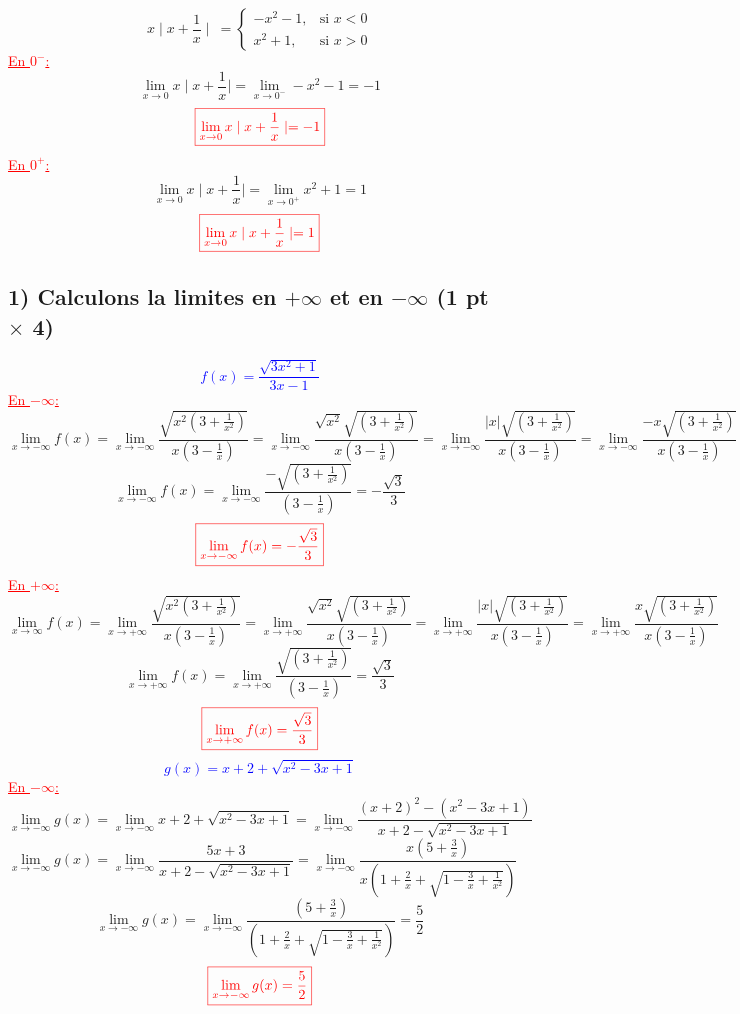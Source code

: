 \documentclass[12pt]{article}
\begin{document}
\[ x\mid x+\frac{1}{x}\mid\ = \begin{cases} 
  -x^{2}-1, & \text{si } x < 0 \\
  x^{2}+1, & \text{si } x > 0
\end{cases} \]
\textcolor{red}{\underline{En $0^{-}$:}}
\[\lim_{x \to 0}x\mid x+\frac{1}{x}\mid=\lim_{x \to 0^{-}}-x^{2}-1=-1\]
\[\textcolor{red}{\boxed{\lim_{x \to 0}x\mid x+\frac{1}{x}\mid=-1}}\]
\textcolor{red}{\underline{En $0^{+}$:}}
\[\lim_{x \to 0}x\mid x+\frac{1}{x}\mid=\lim_{x \to 0^{+}}x^{2}+1=1\]
\[\textcolor{red}{\boxed{\lim_{x \to 0}x\mid x+\frac{1}{x}\mid=1}}\]
\subsection*{1) Calculons la limites en $+\infty$ et en $-\infty$ (1 pt $\times$ 4)}
\textcolor{blue}{\[ f(x)=\frac{\sqrt{3x^{2}+1}}{3x-1}\]} 
\textcolor{red}{\underline{En $-\infty$:}}
\[\lim_{x \to -\infty}f(x)=\lim_{x \to -\infty}\frac{\sqrt{x^{2}(3+\frac{1}{x^{2}})}}{x(3-\frac{1}{x})}=\lim_{x \to -\infty}\frac{\sqrt{x^{2}}\sqrt{(3+\frac{1}{x^{2}})}}{x(3-\frac{1}{x})}=\lim_{x \to -\infty}\frac{|x|\sqrt{(3+\frac{1}{x^{2}})}}{x(3-\frac{1}{x})}=\lim_{x \to -\infty}\frac{-x\sqrt{(3+\frac{1}{x^{2}})}}{x(3-\frac{1}{x})}\]
\[\lim_{x \to -\infty}f(x)=\lim_{x \to -\infty}\frac{-\sqrt{(3+\frac{1}{x^{2}})}}{(3-\frac{1}{x})}=-\frac{\sqrt{3}}{3}\]
\[\textcolor{red}{\boxed{\lim_{x \to -\infty}f(x)=-\frac{\sqrt{3}}{3}}}\]
\textcolor{red}{\underline{En $+\infty$:}}
\[\lim_{x \to \infty}f(x)=\lim_{x \to +\infty}\frac{\sqrt{x^{2}(3+\frac{1}{x^{2}})}}{x(3-\frac{1}{x})}=\lim_{x \to +\infty}\frac{\sqrt{x^{2}}\sqrt{(3+\frac{1}{x^{2}})}}{x(3-\frac{1}{x})}=\lim_{x \to +\infty}\frac{|x|\sqrt{(3+\frac{1}{x^{2}})}}{x(3-\frac{1}{x})}=\lim_{x \to +\infty}\frac{x\sqrt{(3+\frac{1}{x^{2}})}}{x(3-\frac{1}{x})}\]
\[\lim_{x \to +\infty}f(x)=\lim_{x \to +\infty}\frac{\sqrt{\left( 3+\frac{1}{x^{2}}\right) }}{\left( 3-\frac{1}{x}\right)}=\frac{\sqrt{3}}{3}\]
\[\textcolor{red}{\boxed{\lim_{x \to +\infty}f(x)=\frac{\sqrt{3}}{3}}}\]
\textcolor{blue}{\[g(x)=x+2+\sqrt{x^{2}-3x+1}\]}
\textcolor{red}{\underline{En $-\infty$:}}
\[\lim_{x \to -\infty}g(x)=\lim_{x \to -\infty}x+2+\sqrt{x^{2}-3x+1}=\lim_{x \to -\infty}\frac{(x+2)^{2}-(x^{2}-3x+1)}{x+2-\sqrt{x^{2}-3x+1}}\]
\[\lim_{x \to -\infty}g(x)=\lim_{x \to -\infty}\frac{5x+3}{x+2-\sqrt{x^{2}-3x+1}}=\lim_{x \to -\infty}\frac{x(5+\frac{3}{x})}{x\left(1+\frac{2}{x}+\sqrt{1-\frac{3}{x}+\frac{1}{x^{2}}}\right)}\]
\[\lim_{x \to -\infty}g(x)=\lim_{x \to -\infty}\frac{(5+\frac{3}{x})}{\left(1+\frac{2}{x}+\sqrt{1-\frac{3}{x}+\frac{1}{x^{2}}}\right)}=\frac{5}{2}\]
\[\textcolor{red}{\boxed{\lim_{x \to -\infty}g(x)=\frac{5}{2}}}\]
\end{document}
